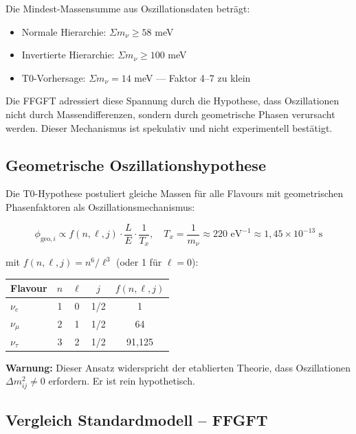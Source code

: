 	Die Mindest-Massensumme aus Oszillationsdaten beträgt:
	
	\begin{itemize}
		\item Normale Hierarchie: \(\Sigma m_\nu \geq 58\) meV
		\item Invertierte Hierarchie: \(\Sigma m_\nu \geq 100\) meV
		\item T0-Vorhersage: \(\Sigma m_\nu = 14\) meV — Faktor 4--7 zu klein
	\end{itemize}
	
	Die FFGFT adressiert diese Spannung durch die Hypothese, dass Oszillationen nicht durch Massendifferenzen, sondern durch geometrische Phasen verursacht werden. Dieser Mechanismus ist spekulativ und nicht experimentell bestätigt.
	
	\subsection*{Geometrische Oszillationshypothese}
	
	Die T0-Hypothese postuliert gleiche Massen für alle Flavours mit geometrischen Phasenfaktoren als Oszillationsmechanismus:
	
	\begin{equation}
		\phi_{\text{geo}, i} \propto f(n, \ell, j) \cdot \frac{L}{E} \cdot \frac{1}{T_x}, \quad T_x = \frac{1}{m_\nu} \approx 220\text{ eV}^{-1} \approx 1{,}45 \times 10^{-13}\text{ s}
	\end{equation}
	
	mit \(f(n,\ell,j) = n^6/\ell^3\) (oder 1 für \(\ell = 0\)):
	
	\begin{center}
		\small
		\begin{tabular}{lcccc}
			\textbf{Flavour} & \(n\) & \(\ell\) & \(j\) & \(f(n,\ell,j)\) \\
			\hline
			\(\nu_e\) & 1 & 0 & 1/2 & 1 \\
			\(\nu_\mu\) & 2 & 1 & 1/2 & 64 \\
			\(\nu_\tau\) & 3 & 2 & 1/2 & 91,125 \\
		\end{tabular}
	\end{center}
	
	\textbf{Warnung:} Dieser Ansatz widerspricht der etablierten Theorie, dass Oszillationen \(\Delta m^2_{ij} \neq 0\) erfordern. Er ist rein hypothetisch.
	
	\subsection*{Vergleich Standardmodell -- FFGFT}
	
